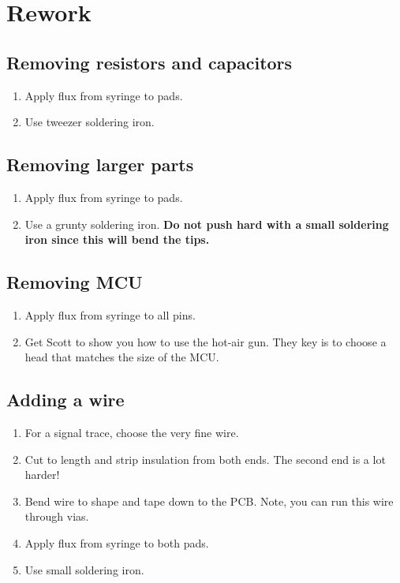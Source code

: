\chapter{Rework}


\section{Removing resistors and capacitors}

\begin{enumerate}
\item Apply flux from syringe to pads.

\item Use tweezer soldering iron.
\end{enumerate}


\section{Removing larger parts}


\begin{enumerate}
\item Apply flux from syringe to pads.

\item Use a grunty soldering iron.  \textbf{Do not push hard with a
  small soldering iron since this will bend the tips.}
\end{enumerate}



\section{Removing MCU}

\begin{enumerate}
\item Apply flux from syringe to all pins.

\item Get Scott to show you how to use the hot-air gun.  They key is
  to choose a head that matches the size of the MCU.
  
\end{enumerate}



\section{Adding a wire}

\begin{enumerate}
\item For a signal trace, choose the very fine wire.

\item Cut to length and strip insulation from both ends.  The second
  end is a lot harder!

\item Bend wire to shape and tape down to the PCB.  Note, you can run
  this wire through vias.

\item Apply flux from syringe to both pads.

\item Use small soldering iron.  
\end{enumerate}
